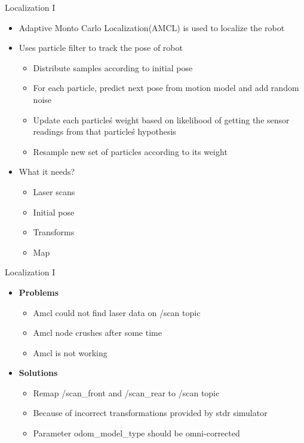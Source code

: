 \begin{frame}{Localization I}
    \begin{itemize}
        \item Adaptive Monto Carlo Localization(AMCL) is used to localize the robot
        \item Uses particle filter to track the pose of robot
        \begin{itemize}
          \item Distribute samples according to initial pose
          \item For each particle, predict next pose from motion model and add random noise
          \item Update each particle\'s weight based on 
likelihood of getting the sensor readings from
that particle\'s hypothesis
          \item Resample new set of particles according to its weight	
        \end{itemize}
        \item What it needs?
        \begin{itemize}
            \item Laser scans
            \item Initial pose
            \item Transforms
            \item Map 
        \end{itemize}
    \end{itemize}
\end{frame}
\begin{frame}{Localization I}
\begin{itemize}
	\item \textbf{Problems}
	\begin{itemize}
		\item Amcl could not find laser data on /scan topic
		\item Amcl node crushes after some time
		\item Amcl is not working
	\end{itemize}
	\item \textbf{Solutions}
	\begin{itemize}
		\item Remap /scan\_front and /scan\_rear to /scan topic
		\item Because of incorrect transformations provided by stdr simulator
		\item Parameter odom_model_type should be omni-corrected
	\end{itemize}
\end{itemize}
\end{frame}